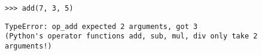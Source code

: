 \begin{blocksection}
\question \begin{lstlisting}
>>> add(7, 3, 5)
\end{lstlisting}

\begin{solution}[0.5in]
\begin{verbatim}
TypeError: op_add expected 2 arguments, got 3
(Python's operator functions add, sub, mul, div only take 2 arguments!)
\end{verbatim}
\end{solution}
\end{blocksection}
